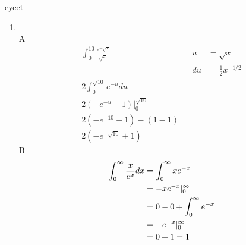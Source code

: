 \documentclass[11pt]{article}
\begin{document}
    eyeet
    \begin{enumerate}
        \item \\
        \subitem A
    \begin{align*}
        \int_{0}^{10}{\frac{e^{-\sqrt{x}}}{\sqrt{x}}} &&
        u &= \sqrt{x} \\ &&
        du &= \frac{1}{2}x^{-1/2} \\
        2\int_{0}^{\sqrt{10}}e^{-u}du \\
        2(-e^{-u} -1)\big\vert_{0}^{\sqrt{10}} \\
        2(-e^{-10} -1) - (1-1) \\
        2(-e^{-\sqrt{10}} + 1)
    \end{align*}
        \subitem B
        \begin{align*}
            \int_{0}^{\infty}\frac{x}{e^x}dx &= \int_{0}^{\infty}xe^{-x} \\
            &=-xe^{-x}\arrowvert_{0}^{\infty} \\
            &= 0-0 + \int_{0}^{\infty}e^{-x} \\
            &= -e^{-x}\arrowvert_{0}^{\infty} \\
            &= 0 +1 = 1
        \end{align*}

    \end{enumerate}
\end{document}

